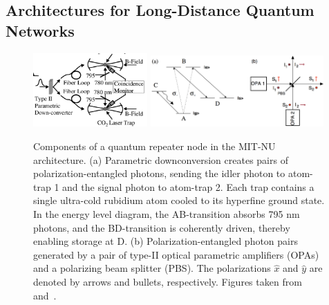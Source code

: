 \documentclass[aps,twocolumn,secnumarabic,amsmath,amssymb,pra,groupedaddress,
showpacs, showkeys]{revtex4-1}
\begin{document}
\subsection{Architectures for Long-Distance Quantum Networks\label{sec:intro:architectures}}

\begin{figure}[t]
	\centering
	\includegraphics[width=0.39\textwidth]{figures/node}
  	\includegraphics[width=0.59\textwidth]{figures/level_structure_opa1}
	\caption{Components of a quantum repeater node in the MIT-NU architecture. (a) Parametric downconversion creates pairs of polarization-entangled photons, sending the idler photon to atom-trap 1 and the signal photon to atom-trap 2. Each trap contains a single ultra-cold rubidium atom cooled to its hyperfine ground state. In the energy level diagram, the AB-transition absorbs 795 nm photons, and the BD-transition is coherently driven, thereby enabling storage at D. (b) Polarization-entangled photon pairs generated by a pair of type-II optical parametric amplifiers (OPAs) and a polarizing beam splitter (PBS). The polarizations $\hat{x}$ and $\hat{y}$ are denoted by arrows and bullets, respectively. Figures taken from~\cite{PhysRevLett.87.167903} and~\cite{1464-4266-2-1-101}.}
	\label{fig:diagram}
\end{figure}
\end{document}
